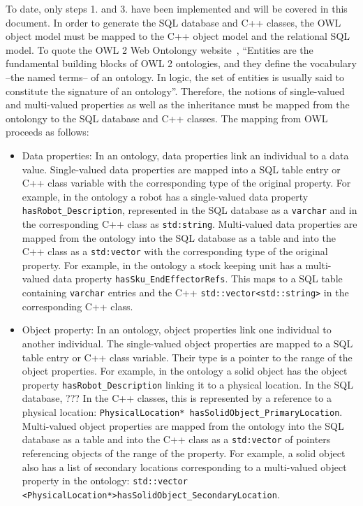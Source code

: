 To date, only steps 1. and 3. have been implemented and will be covered in this document.
In order to generate the SQL database and C++ classes, the OWL object model must be mapped to the C++ object model and the relational SQL model. 
To quote the OWL 2 Web Ontolongy website~\cite{OWLspec}, ``Entities are the fundamental building blocks of OWL 2 ontologies, 
and they define the vocabulary --the named terms-- of an ontology. In logic, the set of entities is usually said to constitute the 
signature of an ontology''. Therefore, the notions of single-valued and multi-valued properties as well as the inheritance must be 
mapped from the ontolongy to the SQL database and C++ classes. The mapping from OWL proceeds as follows:
\begin{itemize}
\item Data properties: In an ontology, data properties link an individual to a data value. Single-valued data properties are mapped into a SQL table entry or C++ class
variable with the corresponding type of the original property. For example, in the ontology a robot has a single-valued data 
property \texttt{hasRobot\_Description}, represented in the
SQL database as a \texttt{varchar} and in the corresponding C++ class as \texttt{std:string}. 
Multi-valued data properties are mapped from the ontology into the SQL database as a table and into the C++ class as a \texttt{std:vector} with the corresponding
type of the original property. For example,
in the ontology a stock keeping unit has a multi-valued
data property \texttt{hasSku\_EndEffectorRefs}. This maps to a SQL table containing \texttt{varchar} entries and the C++
\texttt{std::vector\textless std::string\textgreater} in the corresponding C++ class.

\item Object property: In an ontology, object properties link one individual to another individual. 
The single-valued object properties are mapped to a SQL table entry or C++ class
variable. Their type is a pointer to the range of the object properties. For example, in the ontology a solid object has the object property \texttt{hasRobot\_Description} 
linking it to a physical location. In the SQL database, ??? In the C++ classes, this is represented by a reference to a physical location: \texttt{PhysicalLocation* hasSolidObject\_PrimaryLocation}.
Multi-valued object properties are mapped from the ontology into the SQL database as a table and into the C++ class as a \texttt{std:vector} of pointers referencing objects of the range of the property.  For example, a solid object also has a list of secondary locations corresponding to a multi-valued object property in the ontology: {\scriptsize\texttt{std::vector\\ \textless PhysicalLocation*\textgreater hasSolidObject\_SecondaryLocation}}.
\end{itemize}

